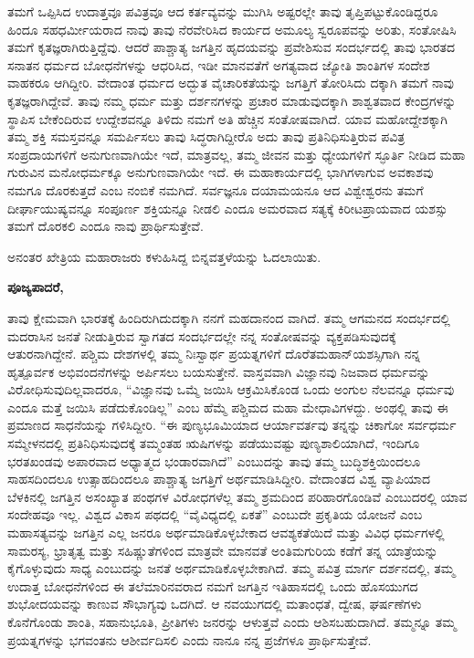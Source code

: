 ತಮಗೆ ಒಪ್ಪಿಸಿದ ಉದಾತ್ತವೂ ಪವಿತ್ರವೂ ಆದ ಕರ್ತವ್ಯವನ್ನು ಮುಗಿಸಿ ಅಷ್ಟರಲ್ಲೇ ತಾವು ತೃಪ್ತಿಪಟ್ಟುಕೊಂಡಿದ್ದರೂ ಹಿಂದೂ ಸಹಧರ್ಮೀಯರಾದ ನಾವು ತಾವು ನೆರವೇರಿಸಿದ ಕಾರ್ಯದ ಅಮೂಲ್ಯ ಸ್ವರೂಪವನ್ನು ಅರಿತು, ಸಂತೋಷಿಸಿ ತಮಗೆ ಕೃತಜ್ಞರಾಗಿರುತ್ತಿದ್ದೆವು. ಆದರೆ ಪಾಶ್ಚಾತ್ಯ ಜಗತ್ತಿನ ಹೃದಯವನ್ನು ಪ್ರವೇಶಿಸುವ ಸಂದರ್ಭದಲ್ಲಿ ತಾವು ಭಾರತದ ಸನಾತನ ಧರ್ಮದ ಬೋಧನೆಗಳನ್ನು ಆಧರಿಸಿದ, ಇಡೀ ಮಾನವತೆಗೆ ಅಗತ್ಯವಾದ ಜ್ಯೋತಿ ಶಾಂತಿಗಳ ಸಂದೇಶ ವಾಹಕರೂ ಆಗಿದ್ದೀರಿ. ವೇದಾಂತ ಧರ್ಮದ ಅದ್ಭುತ ವೈಚಾರಿಕತೆಯನ್ನು ಜಗತ್ತಿಗೆ ತೋರಿಸಿದು ದಕ್ಕಾಗಿ ತಮಗೆ ನಾವು ಕೃತಜ್ಞರಾಗಿದ್ದೇವೆ. ತಾವು ನಮ್ಮ ಧರ್ಮ ಮತ್ತು ದರ್ಶನಗಳನ್ನು ಪ್ರಚಾರ ಮಾಡುವುದಕ್ಕಾಗಿ ಶಾಶ್ವತವಾದ ಕೇಂದ್ರಗಳನ್ನು ಸ್ಥಾಪಿಸ ಬೇಕೆಂದಿರುವ ಉದ್ದೇಶವನ್ನೂ ತಿಳಿದು ನಮಗೆ ಅತಿ ಹೆಚ್ಚಿನ ಸಂತೋಷವಾಗಿದೆ. ಯಾವ ಮಹೋದ್ದೇಶಕ್ಕಾಗಿ ತಮ್ಮ ಶಕ್ತಿ ಸಮಸ್ತವನ್ನೂ ಸಮರ್ಪಿಸಲು ತಾವು ಸಿದ್ಧರಾಗಿದ್ದೀರೊ ಅದು ತಾವು ಪ್ರತಿನಿಧಿಸುತ್ತಿರುವ ಪವಿತ್ರ ಸಂಪ್ರದಾಯಗಳಿಗೆ ಅನುಗುಣವಾಗಿಯೇ ಇದೆ, ಮಾತ್ರವಲ್ಲ, ತಮ್ಮ ಜೀವನ ಮತ್ತು ಧ್ಯೇಯಗಳಿಗೆ ಸ್ಫೂರ್ತಿ ನೀಡಿದ ಮಹಾ ಗುರುವಿನ ಮನೋಧರ್ಮಕ್ಕೂ ಅನುಗುಣವಾಗಿಯೇ ಇದೆ. ಈ ಮಹಾಕಾರ್ಯದಲ್ಲಿ ಭಾಗಿಗಳಾಗುವ ಅವಕಾಶವು ನಮಗೂ ದೊರಕುತ್ತದೆ ಎಂಬ ನಂಬಿಕೆ ನಮಗಿದೆ. ಸರ್ವಜ್ಞನೂ ದಯಾಮಯನೂ ಆದ ವಿಶ್ವೇಶ್ವರನು ತಮಗೆ ದೀರ್ಘಾಯುಷ್ಯವನ್ನೂ ಸಂಪೂರ್ಣ ಶಕ್ತಿಯನ್ನೂ ನೀಡಲಿ ಎಂದೂ ಅಮರವಾದ ಸತ್ಯಕ್ಕೆ ಕಿರೀಟಪ್ರಾಯವಾದ ಯಶಸ್ಸು ತಮಗೆ ದೊರಕಲಿ ಎಂದೂ ನಾವು ಪ್ರಾರ್ಥಿಸುತ್ತೇವೆ. 

ಅನಂತರ ಖೇತ್ರಿಯ ಮಹಾರಾಜರು ಕಳುಹಿಸಿದ್ದ ಬಿನ್ನವತ್ತಳೆಯನ್ನು ಓದ\-ಲಾಯಿತು. 

\textbf{ಪೂಜ್ಯಪಾದರೆ, }

ತಾವು ಕ್ಷೇಮವಾಗಿ ಭಾರತಕ್ಕೆ ಹಿಂದಿರುಗಿದುದಕ್ಕಾಗಿ ನನಗೆ ಮಹದಾನಂದ ವಾಗಿದೆ. ತಮ್ಮ ಆಗಮನದ ಸಂದರ್ಭದಲ್ಲಿ ಮದರಾಸಿನ ಜನತೆ ನೀಡುತ್ತಿರುವ ಸ್ವಾಗತದ ಸಂದರ್ಭದಲ್ಲೇ ನನ್ನ ಸಂತೋಷವನ್ನು ವ್ಯಕ್ತಪಡಿಸುವುದಕ್ಕೆ ಆತುರ\-ನಾಗಿದ್ದೇನೆ. ಪಶ್ಚಿಮ ದೇಶಗಳಲ್ಲಿ ತಮ್ಮ ನಿಃಸ್ವಾರ್ಥ ಪ್ರಯತ್ನಗಳಿಗೆ ದೊರೆತ\break ಮಹಾನ್​ ಯಶಸ್ಸಿಗಾಗಿ ನನ್ನ ಹೃತ್ಪೂರ್ವಕ ಅಭಿವಂದನೆಗಳನ್ನು ಅರ್ಪಿಸಲು ಬಯಸುತ್ತೇನೆ. ವಾಸ್ತವವಾಗಿ ವಿಜ್ಞಾನವು ನಿಜವಾದ ಧರ್ಮವನ್ನು ವಿರೋಧಿಸುವುದಿಲ್ಲವಾದರೂ, “ವಿಜ್ಞಾನವು ಒಮ್ಮೆ ಜಯಿಸಿ ಆಕ್ರಮಿಸಿಕೊಂಡ ಒಂದು ಅಂಗುಲ ನೆಲವನ್ನೂ ಧರ್ಮವು ಎಂದೂ ಮತ್ತೆ ಜಯಿಸಿ ಪಡೆದುಕೊಂಡಿಲ್ಲ” ಎಂಬ ಹೆಮ್ಮೆ ಪಶ್ಚಿಮದ ಮಹಾ ಮೇಧಾವಿಗಳದ್ದು. ಅಂಥಲ್ಲಿ ತಾವು ಈ ಪ್ರಮಾಣದ ಸಾಧನೆಯನ್ನು ಗಳಿಸಿದ್ದೀರಿ. “ಈ ಪುಣ್ಯಭೂಮಿಯಾದ ಆರ್ಯಾವರ್ತವು ತನ್ನನ್ನು ಚಿಕಾಗೋ ಸರ್ವಧರ್ಮ ಸಮ್ಮೇಳನದಲ್ಲಿ ಪ್ರತಿನಿಧಿಸುವುದಕ್ಕೆ ತಮ್ಮಂತಹ ಋಷಿಗಳನ್ನು ಪಡೆಯುವಷ್ಟು ಪುಣ್ಯಶಾಲಿಯಾಗಿದೆ, ಇಂದಿಗೂ ಭರತಖಂಡವು ಅಪಾರವಾದ ಅಧ್ಯಾತ್ಮದ ಭಂಡಾರವಾಗಿದೆ” ಎಂಬುದನ್ನು ತಾವು ತಮ್ಮ ಬುದ್ಧಿಶಕ್ತಿಯಿಂದಲೂ ಸಾಹಸದಿಂದಲೂ ಉತ್ಸಾಹದಿಂದಲೂ ಪಾಶ್ಚಾತ್ಯ ಜಗತ್ತಿಗೆ ಅರ್ಥಮಾಡಿಸಿದ್ದೀರಿ. ವೇದಾಂತದ ವಿಶ್ವ ವ್ಯಾಪಿಯಾದ ಬೆಳಕಿನಲ್ಲಿ ಜಗತ್ತಿನ ಅಸಂಖ್ಯಾತ ಪಂಥಗಳ ವಿರೋಧಗಳೆಲ್ಲ ತಮ್ಮ ಶ್ರಮದಿಂದ ಪರಿಹಾರಗೊಂಡಿವೆ ಎಂಬುದರಲ್ಲಿ ಯಾವ ಸಂದೇಹವೂ ಇಲ್ಲ. ವಿಶ್ವದ ವಿಕಾಸ ಪಥದಲ್ಲಿ “ವೈವಿಧ್ಯದಲ್ಲಿ ಏಕತೆ” ಎಂಬುದೇ ಪ್ರಕೃತಿಯ ಯೋಜನೆ ಎಂಬ ಮಹಾಸತ್ಯವನ್ನು ಜಗತ್ತಿನ ಎಲ್ಲ ಜನರೂ ಅರ್ಥಮಾಡಿಕೊಳ್ಳಬೇಕಾದ ಆವಶ್ಯಕತೆಯಿದೆ ಮತ್ತು ವಿವಿಧ ಧರ್ಮಗಳಲ್ಲಿ ಸಾಮರಸ್ಯ, ಭ್ರಾತೃತ್ವ ಮತ್ತು ಸಹಿಷ್ಣುತೆಗಳಿಂದ ಮಾತ್ರವೇ ಮಾನವತೆ ಅಂತಿಮಗುರಿಯ ಕಡೆಗೆ ತನ್ನ ಯಾತ್ರೆಯನ್ನು ಕೈಗೊಳ್ಳುವುದು ಸಾಧ್ಯ ಎಂಬುದನ್ನು ಜನತೆ ಅರ್ಥಮಾಡಿಕೊಳ್ಳಬೇಕಾಗಿದೆ. ತಮ್ಮ ಪವಿತ್ರ ಮಾರ್ಗ ದರ್ಶನದಲ್ಲಿ, ತಮ್ಮ ಉದಾತ್ತ ಬೋಧನೆಗಳಿಂದ ಈ ತಲೆಮಾರಿನವರಾದ ನಮಗೆ ಜಗತ್ತಿನ ಇತಿಹಾಸದಲ್ಲಿ ಒಂದು ಹೊಸಯುಗದ ಶುಭೋದಯವನ್ನು ಕಾಣುವ ಸೌಭಾಗ್ಯವು ಒದಗಿದೆ. ಆ ನವಯುಗದಲ್ಲಿ ಮತಾಂಧತೆ, ದ್ವೇಷ, ಘರ್ಷಣೆಗಳು ಕೊನೆಗೊಂಡು ಶಾಂತಿ, ಸಹಾನುಭೂತಿ, ಪ್ರೀತಿಗಳು ಜನರನ್ನು ಆಳುತ್ತವೆ ಎಂದು ಆಶಿಸಬಹುದಾಗಿದೆ. ತಮ್ಮನ್ನೂ ತಮ್ಮ ಪ್ರಯತ್ನಗಳನ್ನು ಭಗವಂತನು ಆಶೀರ್ವದಿಸಲಿ ಎಂದು ನಾನೂ ನನ್ನ ಪ್ರಜೆಗಳೂ ಪ್ರಾರ್ಥಿಸುತ್ತೇವೆ. 

